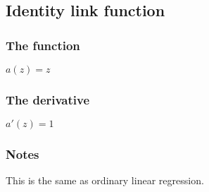
\subsection{Identity link function}

\subsubsection{The function}

\(a(z)=z\)

\subsubsection{The derivative}

\(a'(z)=1\)

\subsubsection{Notes}

This is the same as ordinary linear regression.

